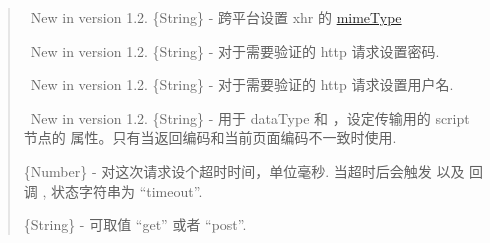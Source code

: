 \documentclass[letterpaper,10pt,english]{sphinxmanual}
\begin{document}
\begin{quote}

\begin{fulllineitems}
\label{api/core/ajax/io:io.cfg.mimeType}~New in version 1.2.
\{String\} -  跨平台设置 xhr 的 \href{https://developer.mozilla.org/en/XmlHttpRequest\#overrideMimeType\%28\%29}{mimeType}

\end{fulllineitems}



\begin{fulllineitems}
\label{api/core/ajax/io:io.cfg.password}~New in version 1.2.
\{String\} -  对于需要验证的 http 请求设置密码.

\end{fulllineitems}



\begin{fulllineitems}
\label{api/core/ajax/io:io.cfg.username}~New in version 1.2.
\{String\} -  对于需要验证的 http 请求设置用户名.

\end{fulllineitems}



\begin{fulllineitems}
\label{api/core/ajax/io:io.cfg.scriptCharset}~New in version 1.2.
\{String\} -  用于 dataType  和  ，设定传输用的 script 节点的  属性。只有当返回编码和当前页面编码不一致时使用.

\end{fulllineitems}



\begin{fulllineitems}
\label{api/core/ajax/io:io.cfg.timeout}
\{Number\} -  对这次请求设个超时时间，单位毫秒. 当超时后会触发  以及  回调 , 状态字符串为 ``timeout''.

\end{fulllineitems}



\begin{fulllineitems}
\label{api/core/ajax/io:io.cfg.type}
\{String\} -  可取值 ``get'' 或者 ``post''.


\end{fulllineitems}
\end{quote}
\end{document}
